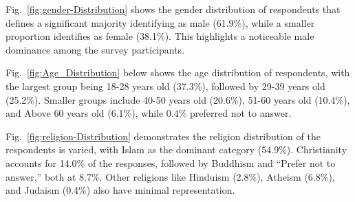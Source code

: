 \documentclass[pt]{article}  %
\begin{document}
Fig.~\ref{fig:gender-Distribution} shows the gender distribution of respondents that defines a significant majority identifying as male (61.9\%), while a smaller proportion identifies as female (38.1\%). This highlights a noticeable male dominance among the survey participants.

Fig.~\ref{fig:Age_Distribution} below shows the age distribution of respondents, with the largest group being 18-28 years old (37.3\%), followed by 29-39 years old (25.2\%). Smaller groups
include 40-50 years old (20.6\%), 51-60 years old (10.4\%), and Above 60 years old (6.1\%),
while 0.4\% preferred not to answer.

Fig.~\ref{fig:religion-Distribution} demonstrates the religion distribution of the respondents is varied, with Islam as the dominant category (54.9\%). Christianity accounts for 14.0\% of the responses, followed by Buddhism and “Prefer not to answer,” both at 8.7\%. Other religions like Hinduism (2.8\%), Atheism (6.8\%), and Judaism (0.4\%) also have minimal representation.
\end{document}
